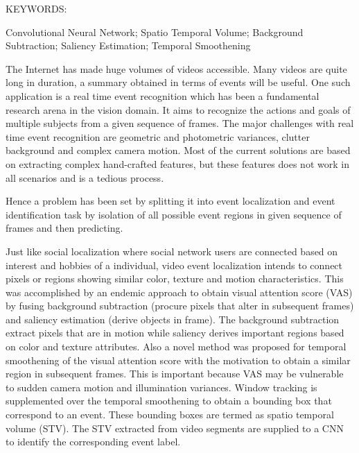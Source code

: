 \abstract

\noindent KEYWORDS: \hspace*{0.5em} \parbox[t]{4.4in}{Convolutional Neural Network; Spatio Temporal Volume; Background Subtraction; Saliency Estimation; Temporal Smoothening}

\vspace*{24pt}
The Internet has made huge volumes of videos accessible.   Many videos are quite long in duration, a summary obtained in terms of events will be useful.
One such application is a real time event recognition which has been a fundamental research arena in the vision domain. It aims to recognize the actions and goals of multiple subjects from a given sequence of frames. The major challenges with real time event recognition are geometric and photometric variances, clutter background and complex camera motion. Most of the current solutions are based on extracting complex hand-crafted features, but these features does not work in all scenarios and is a tedious process. 

\par Hence a problem has been set by splitting it into event localization and event identification task by isolation of all possible event regions in given sequence of frames and then predicting. 

\par Just like social localization where social network users are connected based on interest and hobbies of a individual, video event localization intends to connect pixels or regions showing similar color, texture and motion characteristics.  This was accomplished by an endemic approach to obtain visual attention score (VAS) by fusing background subtraction (procure pixels that alter in subsequent frames) and saliency estimation (derive objects in frame). The background subtraction extract pixels that are in motion while saliency  derives important regions based on color and texture attributes. Also a  novel method was proposed for temporal smoothening of the visual attention score  with the motivation to obtain a similar region in subsequent frames. This is important because VAS may be vulnerable to sudden camera motion and illumination variances.  Window tracking is supplemented over the temporal smoothening to obtain a bounding box that correspond to an event. These bounding boxes are termed as spatio temporal volume (STV). The STV extracted from video segments are supplied to a CNN to identify the corresponding event label.

